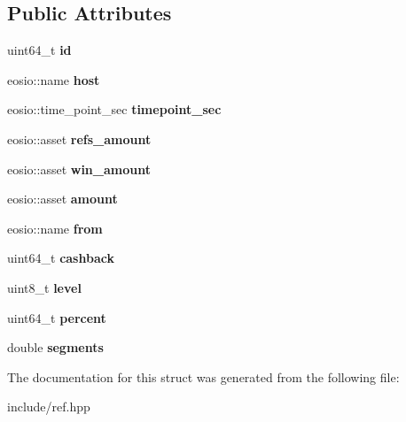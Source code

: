 \subsection*{Public Attributes}
\begin{DoxyCompactItemize}
\item 
\mbox{\label{structeosio_1_1refbalances_a88f024b828b2bbdc1de415acf4fe51ee}} 
uint64\+\_\+t {\bfseries id}
\item 
\mbox{\label{structeosio_1_1refbalances_a30c753342929bb15cb221516bb8b7f51}} 
eosio\+::name {\bfseries host}
\item 
\mbox{\label{structeosio_1_1refbalances_acd8d45dd8c8ad002df7f7d3b8ef5ce2a}} 
eosio\+::time\+\_\+point\+\_\+sec {\bfseries timepoint\+\_\+sec}
\item 
\mbox{\label{structeosio_1_1refbalances_a570451b9ba52dd7607f164f3f68ffe24}} 
eosio\+::asset {\bfseries refs\+\_\+amount}
\item 
\mbox{\label{structeosio_1_1refbalances_af12e01dfdeeeea85d88363a042af253b}} 
eosio\+::asset {\bfseries win\+\_\+amount}
\item 
\mbox{\label{structeosio_1_1refbalances_abe419a7f91c10e7594e8af6d6cbf3282}} 
eosio\+::asset {\bfseries amount}
\item 
\mbox{\label{structeosio_1_1refbalances_a987729685eb6421e2742d6f9764e3ac5}} 
eosio\+::name {\bfseries from}
\item 
\mbox{\label{structeosio_1_1refbalances_ae6e92371188612045e90898fedbe5ece}} 
uint64\+\_\+t {\bfseries cashback}
\item 
\mbox{\label{structeosio_1_1refbalances_a49a19bdad797132114aa39bce45a4971}} 
uint8\+\_\+t {\bfseries level}
\item 
\mbox{\label{structeosio_1_1refbalances_a28e5569fbbb36ea748e48a68861d9ce3}} 
uint64\+\_\+t {\bfseries percent}
\item 
\mbox{\label{structeosio_1_1refbalances_a240d19bc137d43af732c132468d6251b}} 
double {\bfseries segments}
\end{DoxyCompactItemize}


The documentation for this struct was generated from the following file\+:\begin{DoxyCompactItemize}
\item 
include/ref.\+hpp\end{DoxyCompactItemize}
